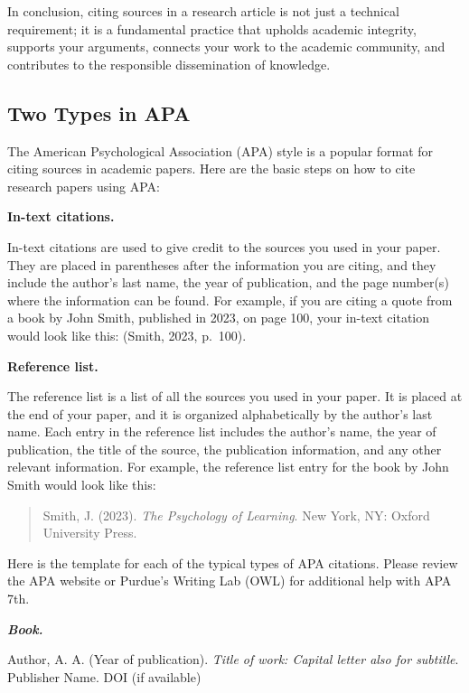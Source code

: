 \documentclass[
  b5paper]{book}
\begin{document}
In conclusion, citing sources in a research article is not just a technical requirement; it is a fundamental practice that upholds academic integrity, supports your arguments, connects your work to the academic community, and contributes to the responsible dissemination of knowledge.

\hypertarget{two-types-in-apa}{%
\subsection*{Two Types in APA}\label{two-types-in-apa}}

The American Psychological Association (APA) style is a popular format for citing sources in academic papers. Here are the basic steps on how to cite research papers using APA:

\textbf{In-text citations.}

In-text citations are used to give credit to the sources you used in your paper. They are placed in parentheses after the information you are citing, and they include the author's last name, the year of publication, and the page number(s) where the information can be found. For example, if you are citing a quote from a book by John Smith, published in 2023, on page 100, your in-text citation would look like this: (Smith, 2023, p.~100).

\textbf{Reference list.}

The reference list is a list of all the sources you used in your paper. It is placed at the end of your paper, and it is organized alphabetically by the author's last name. Each entry in the reference list includes the author's name, the year of publication, the title of the source, the publication information, and any other relevant information. For example, the reference list entry for the book by John Smith would look like this:

\begin{quote}
Smith, J. (2023). \emph{The Psychology of Learning}. New York, NY: Oxford University Press.
\end{quote}

Here is the template for each of the typical types of APA citations. Please review the APA website or Purdue's Writing Lab (OWL) for additional help with APA 7th.

\textbf{\emph{Book.}}

Author, A. A. (Year of publication). \emph{Title of work: Capital letter also for subtitle}. Publisher Name. DOI (if available)
\end{document}

